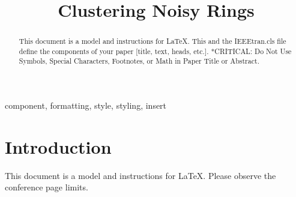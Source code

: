 \documentclass[conference]{IEEEtran}
\begin{document}
\title{Clustering Noisy Rings}

\author{

}
\maketitle

\begin{abstract}
This document is a model and instructions for \LaTeX.
This and the IEEEtran.cls file define the components of your paper [title, text, heads, etc.]. *CRITICAL: Do Not Use Symbols, Special Characters, Footnotes, 
or Math in Paper Title or Abstract.
\end{abstract}

\begin{IEEEkeywords}
component, formatting, style, styling, insert
\end{IEEEkeywords}

\section{Introduction}
This document is a model and instructions for \LaTeX.
Please observe the conference page limits. 
\end{document}

